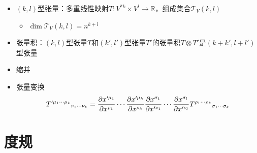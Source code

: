 \begin{itemize}
    \item $(k,l)$型张量：多重线性映射$T:V^{*k} \times V^l \to \mathbb{R}$，组成集合$\mathscr{T}_V(k,l)$
    \begin{itemize}
        \item[\o] $\dim \mathscr{T}_V(k,l)=n^{k+l}$
    \end{itemize}
    \item 张量积：$(k,l)$型张量$T$和$(k',l')$型张量$T'$的张量积$T \otimes T'$是$(k+k',l+l')$型张量
    \item 缩并
    \item 张量变换
    \begin{gather*}
        {T'^{\mu_1 \cdots \mu_k}}_{\nu_1 \cdots \nu_k}=\frac{\partial x'^{\mu_1}}{\partial x^{\rho_1}} \cdots \frac{\partial x'^{\mu_k}}{\partial x^{\rho_k}} \frac{\partial x^{\sigma_1}}{\partial x'^{\nu_1}} \cdots \frac{\partial x^{\sigma_l}}{\partial x'^{\nu_l}} {T^{\rho_1 \cdots \rho_k}}_{\sigma_1 \cdots \sigma_k}
    \end{gather*}
\end{itemize}

\section{度规}

